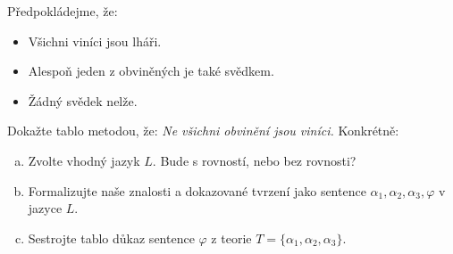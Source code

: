        
\begin{problem}

    Předpokládejme, že:
    \begin{itemize}\it
        \item Všichni viníci jsou lháři.
        \item Alespoň jeden z obviněných je také svědkem.
        \item Žádný svědek nelže.
    \end{itemize}

    Dokažte tablo metodou, že: {\it Ne všichni obvinění jsou viníci.} Konkrétně:
    \begin{enumerate}[(a)]
        \item Zvolte vhodný jazyk $L$. Bude s rovností, nebo bez rovnosti?        
        \item Formalizujte naše znalosti a dokazované tvrzení jako sentence $\alpha_1,\alpha_2,\alpha_3,\varphi$ v jazyce $L$.
        \item Sestrojte tablo důkaz sentence $\varphi$ z teorie $T=\{\alpha_1,\alpha_2,\alpha_3\}$.
    \end{enumerate}

    \begin{solution}
                    
    \end{solution}

\end{problem} 
    


